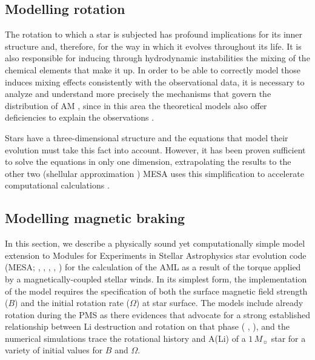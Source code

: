 \documentclass[fleqn,usenatbib]{mnras}
\begin{document}
\subsection{Modelling rotation}
The rotation to which a star is subjected has profound implications for its inner structure and, therefore, for the way in which it evolves throughout its life. It is also responsible for inducing through hydrodynamic instabilities the mixing of the chemical elements that make it up. In order to be able to correctly model those induces mixing effects consistently with the observational data, it is necessary to analyze and understand more precisely the mechanisms that govern the distribution of AM \citep{Pinsonneault1997,Maeder2000}, since in this area the theoretical models also offer deficiencies to explain the observations \citep{Denissenkov2007}. \par

Stars have a three-dimensional structure and the equations that model their evolution must take this fact into account. However, it has been proven sufficient to solve the equations in only one dimension, extrapolating the results to the other two (shellular approximation \citep{Meynet1997}) MESA uses this simplification to accelerate computational calculations \citet{Paxton2013}.\par

\subsection{Modelling magnetic braking} \label{mod_mb}
In this section, we describe a physically sound yet computationally simple model extension to Modules for Experiments in Stellar Astrophysics star evolution code (MESA; \citeauthor{Paxton2011} \citeyear{Paxton2011}, \citeyear{Paxton2013}, \citeyear{Paxton2015}, \citeyear{Paxton2018}, \citeyear{Paxton2019}) for the calculation of the AML as a result of the torque applied by a magnetically-coupled stellar winds. In its simplest form, the implementation of the model requires the specification of both the surface magnetic field strength ($B$) and the initial rotation rate ($\Omega$) at star surface. The models include already rotation during the PMS as there evidences that advocate for a strong established relationship between Li destruction and rotation on that phase (\citeauthor{Bouvier2016} \citeyear{Bouvier2016}, \citeyear{Bouvier2018}), and the numerical simulations trace the rotational history and A(Li) of a $1\, M_{\sun}$ star for a variety of initial values for $B$ and $\Omega$.\par
\end{document}
